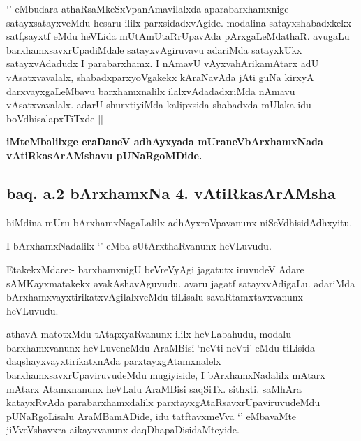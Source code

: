 \begin{artha}

`\stext' eMbudara athaRsaMkeSxVpanAmavilalxda aparabarxhamxnige
  satayxsatayxveMdu hesaru ililx parxsidadxvAgide. modalina
  satayxshabadxkekx satf,sayxtf eMdu heVLida mUtAmUtaRrUpavAda
  pArxgaLeMdathaR. avugaLu barxhamxsavxrUpadiMdale satayxvAgiruvavu
  adariMda satayxkUkx satayxvAdadudx I parabarxhamx. I nAmavU
  vAyxvahArikamAtarx adU vAsatxvavalalx, shabadxparxyoVgakekx
  kAraNavAda jAti guNa kirxyA darxvayxgaLeMbavu barxhamxnalilx
  ilalxvAdadadxriMda nAmavu vAsatxvavalalx. adarU shurxtiyiMda
  kalipxsida shabadxda mUlaka idu boVdhisalapxTiTxde || 
\end{artha}

\begin{center}

\textbf{iMteMbalilxge eraDaneV adhAyxyada mUraneVbArxhamxNada vAtiRkasArAMshavu pUNaRgoMDide.}

\end{center}


\begin{center}

\section*{baq. a.2 bArxhamxNa 4. vAtiRkasArAMsha}


\end{center}

\begin{artha}
hiMdina mUru bArxhamxNagaLalilx adhAyxroVpavanunx
niSeVdhisidAdhxyitu.

I bArxhamxNadalilx `\stext' eMba sUtArxthaRvanunx heVLuvudu. 

EtakekxMdare:- barxhamxnigU beVreVyAgi jagatutx iruvudeV Adare
sAMKayxmatakekx avakAshavAguvudu. avaru jagatf satayxvAdigaLu. adariMda
bArxhamxvayxtirikatxvAgilalxveMdu tiLisalu savaRtamxtavxvanunx heVLuvudu.
\end{artha}

\begin{artha}
athavA matotxMdu tAtapxyaRvanunx ililx heVLabahudu, modalu
barxhamxvanunx heVLuveneMdu AraMBisi `neVti neVti' eMdu tiLisida
daqshayxvayxtirikatxnAda parxtayxgAtamxnalelx
barxhamxsavxrUpaviruvudeMdu mugiyiside, I bArxhamxNadalilx mAtarx
mAtarx Atamxnanunx heVLalu AraMBisi saqSiTx. sithxti. saMhAra
katayxRvAda parabarxhamxdalilx parxtayxgAtaRsavxrUpaviruvudeMdu
pUNaRgoLisalu AraMBamADide, idu tatftavxmeVva `\stext' eMbavaMte
jiVveVshavxra aikayxvanunx daqDhapaDisidaMteyide.
\end{artha}


